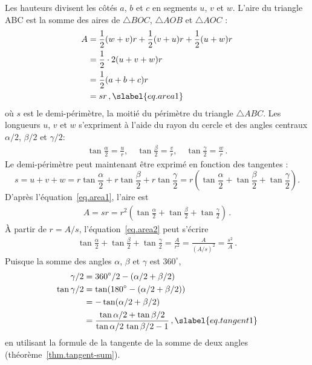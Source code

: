 Les hauteurs divisent les côtés $a$, $b$ et $c$ en segments $u$, $v$ et $w$. L'aire du triangle ABC est la somme des aires de $\triangle BOC$, $\triangle AOB$ et $\triangle AOC$ :
%
\begin{subequations}
\begin{align}
A &= \frac{1}{2}(w+v)r + \frac{1}{2}(v+u)r + \frac{1}{2}(u+w)r\\
&=\frac{1}{2}\cdot 2(u+v+w)r\\
&=\frac{1}{2}(a+b+c)r\\
&=sr\,, \slabel{eq.area1}
\end{align}
\end{subequations}
où $s$ est le demi-périmètre, la moitié du périmètre du triangle $\triangle ABC$. Les longueurs  $u$, $v$ et $w$ s'expriment à l'aide du rayon du cercle et des angles centraux 
 $\alpha/2$, $\beta/2$ et $\gamma/2$:
\begin{align}
\tan \frac{\alpha}{2}= \frac{u}{r},\quad
\tan \frac{\beta}{2} = \frac{v}{r},\quad
\tan \frac{\gamma}{2} =\frac{w}{r}\,.\label{eq.uvw}
\end{align}
Le demi-périmètre peut maintenant être exprimé en fonction des tangentes :
\[
s = u+v+w = r\tan \frac{\alpha}{2}+r\tan \frac{\beta}{2}+r\tan \frac{\gamma}{2} = r\left(\tan \frac{\alpha}{2}+\tan \frac{\beta}{2}+\tan \frac{\gamma}{2}\right).
\]
D'après l'équation~\ref{eq.area1},  l'aire est 
\begin{align}
A = sr = r^2\left(\tan \frac{\alpha}{2}+\tan \frac{\beta}{2}+\tan \frac{\gamma}{2}\right)\,.\label{eq.area2}
\end{align}
\`A partir de $r=A/s$, l'équation~\ref{eq.area2} peut s'écrire
\begin{align}
\tan \frac{\alpha}{2}+\tan \frac{\beta}{2}+\tan \frac{\gamma}{2} = \frac{A}{r^2} = \frac{A}{(A/s)^2} = \frac{s^2}{A}\,.\label{eq.area3}
\end{align}
Puisque la somme des angles $\alpha$, $\beta$ et $\gamma$ est $360^\circ$,
%
\begin{subequations}
\begin{align}
\gamma/2 &= 360^\circ/2 - (\alpha/2 + \beta/2)\\
\tan\gamma/2 &= \tan(180^\circ - (\alpha/2 + \beta/2))\\
 &= -\tan (\alpha/2 + \beta/2)\\
&= \frac{\tan\alpha/2 + \tan\beta/2}{\tan\alpha/2 \, \tan\beta/2-1}\,,\slabel{eq.tangent1}
\end{align}
\end{subequations}
en utilisant la formule de la tangente de la somme de deux angles (théorème~\ref{thm.tangent-sum}).

